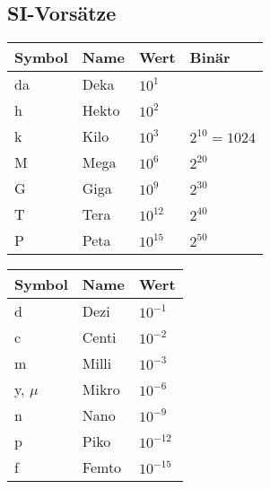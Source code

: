 \subsection{SI-Vorsätze}
\begin{multicols}{2}

\begin{tabular}{|l|l|l|l|}
\hline
\textbf{Symbol}	& \textbf{Name} & \textbf{Wert} & \textbf{Binär} \\
\hline
da	& Deka 	& $10^1$ & \\
\hline
h	& Hekto & $10^2$ & \\ 
\hline
k	& Kilo	& $10^3$ & $2^{10} = 1024$ \\
\hline
M	& Mega	& $10^6$ & $2^{20}$\\
\hline
G	& Giga  & $10^9$ & $2^{30}$\\
\hline
T	& Tera	& $10^{12}$ & $2^{40}$ \\
\hline
P	& Peta	& $10^{15}$ & $2^{50}$\\
\hline
\end{tabular}

\begin{tabular}{|l|l|l|}
\hline
\textbf{Symbol}	& \textbf{Name} & \textbf{Wert} \\
\hline
d	& Dezi	& $10^{-1}$ \\
\hline
c	& Centi	& $10^{-2}$ \\ 
\hline
m	& Milli	& $10^{-3}$ \\
\hline
y, $\mu$ & Mikro & $10^{-6}$ \\
\hline
n	& Nano	& $10^{-9}$ \\
\hline
p	& Piko	& $10^{-12}$ \\
\hline
f	& Femto & $10^{-15}$ \\
\hline
\end{tabular}
\end{multicols}